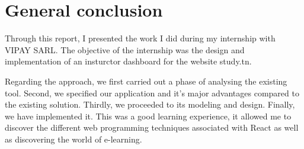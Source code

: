 \section*{General conclusion}
Through this report, I presented the work I did during my internship with
VIPAY SARL. The objective of the internship was the design and implementation of an insturctor dashboard for the website study.tn.

\hfill \break
\hfill \break
Regarding the approach, we first carried out a phase of analysing the existing tool. Second, we specified our application and it's major advantages compared to the existing solution. Thirdly, we proceeded to its modeling and design. Finally, we have implemented it.
\hfill \break
\hfill \break
This was a good learning experience, it allowed me to discover the different
web programming techniques associated with React as well as discovering the world of e-learning.